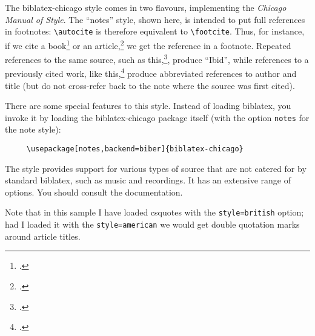 
\usepackage[style=british]{csquotes}
\usepackage[notes,backend=biber]{biblatex-chicago}

\renewcommand{\showingstyle}{chicago notes}
%
The \textsf{biblatex-chicago} style comes in two flavours, implementing the \emph{Chicago Manual of Style}. The \enquote{notes} style, shown here, is intended to put full references in footnotes: \verb|\autocite| is therefore equivalent to \verb|\footcite|. Thus, for instance, if we cite a book\footcite{worman} or an article,\footcite{reese} we get the reference in a footnote. Repeated references to the same source, such as this,\footcite{reese}, produce \enquote{Ibid}, while references to a previously cited work, like this,\footcite{worman} produce abbreviated references to author and title (but do not cross-refer back to the note where the source was first cited).

There are some special features to this style. Instead of loading \textsf{biblatex}, you invoke it by loading the \textsf{biblatex-chicago} package itself (with the option \verb|notes| for the note style):
\begin{verbatim}
     \usepackage[notes,backend=biber]{biblatex-chicago}
\end{verbatim}
The style provides support for various types of source that are not catered for by standard \textsf{biblatex}, such as music and recordings. It has an extensive range of options. You should consult the documentation.

Note that in this sample I have loaded \textsf{csquotes} with the \verb~style=british~ option; had I loaded it with the \verb~style=american~ we would get double quotation marks around article titles.





